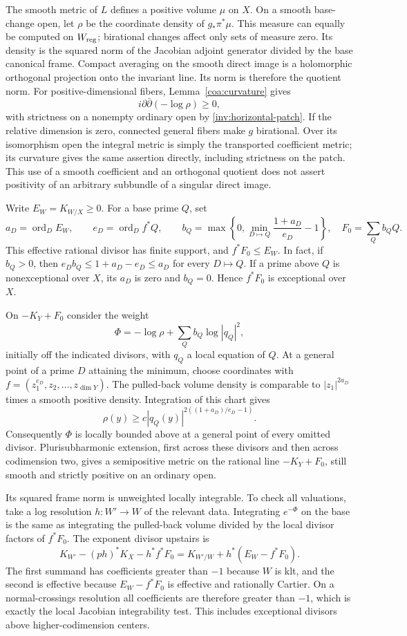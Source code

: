 The smooth metric of $L$ defines a positive volume $\mu$ on $X$.
On a smooth base-change open, let $\rho$ be the coordinate density of
$g_*\pi^*\mu$.  This measure can equally be computed on $W_{\rm reg}$;
birational changes affect only sets of measure zero.  Its density is
the squared norm of the Jacobian adjoint generator divided by the base
canonical frame.  Compact averaging on the smooth direct image is a
holomorphic orthogonal projection onto the invariant line.  Its norm
is therefore the quotient norm.  For positive-dimensional fibers,
Lemma~\ref{coa:curvature} gives
\[
 i\partial\bar\partial(-\log\rho)\ge0,
\]
with strictness on a nonempty ordinary open by
\eqref{inv:horizontal-patch}.  If the relative dimension is zero,
connected general fibers make $g$ birational.  Over its isomorphism
open the integral metric is simply the transported coefficient metric;
its curvature gives the same assertion directly, including strictness
on the patch.  This use of a smooth coefficient and an orthogonal
quotient does not assert positivity of an arbitrary subbundle of a
singular direct image.

Write $E_W=K_{W/X}\ge0$.  For a base prime $Q$, set
\[
 a_D=\operatorname{ord}_D E_W,\qquad
 e_D=\operatorname{ord}_D f^*Q,\qquad
 b_Q=\max\left\{0,\min_{D\mapsto Q}
                         \frac{1+a_D}{e_D}-1\right\},
 \quad F_0=\sum_Q b_QQ.
\]
This effective rational divisor has finite support, and
$f^*F_0\le E_W$.  In fact, if $b_Q>0$, then
$e_Db_Q\le1+a_D-e_D\le a_D$ for every $D\mapsto Q$.
If a prime above $Q$ is nonexceptional over $X$, its $a_D$ is zero
and $b_Q=0$.  Hence $f^*F_0$ is exceptional over $X$.

On $-K_Y+F_0$ consider the weight
\[
 \Phi=-\log\rho+\sum_Qb_Q\log|q_Q|^2,
\]
initially off the indicated divisors, with $q_Q$ a local equation of
$Q$.  At a general point of a prime $D$ attaining the minimum, choose
coordinates with $f=(z_1^{e_D},z_2,\ldots,z_{\dim Y})$.
The pulled-back volume density is comparable to
$|z_1|^{2a_D}$ times a smooth positive density.  Integration of this
chart gives
\[
 \rho(y)\ge c|q_Q(y)|^{2((1+a_D)/e_D-1)}.
\]
Consequently $\Phi$ is locally bounded above at a general point of
every omitted divisor.  Plurisubharmonic extension, first across these
divisors and then across codimension two, gives a semipositive metric
on the rational line $-K_Y+F_0$, still smooth and strictly positive
on an ordinary open.

Its squared frame norm is unweighted locally integrable.  To check all
valuations, take a log resolution $h:W'\to W$ of the relevant data.
Integrating $e^{-\Phi}$ on the base is the same as integrating the
pulled-back volume divided by the local divisor factors of $f^*F_0$.
The exponent divisor upstairs is
\[
 K_{W'}-(ph)^*K_X-h^*f^*F_0
  =K_{W'/W}+h^*(E_W-f^*F_0).
\]
The first summand has coefficients greater than $-1$ because $W$ is
klt, and the second is effective because $E_W-f^*F_0$ is effective
and rationally Cartier.  On a normal-crossings resolution all
coefficients are therefore greater than $-1$, which is exactly the
local Jacobian integrability test.  This includes exceptional divisors
above higher-codimension centers.

